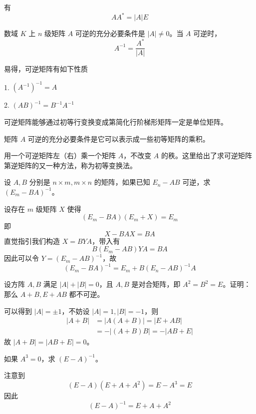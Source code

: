 有
\[AA^* = |A|E\]

\begin{theorem}
	数域 $K$ 上 $n$ 级矩阵 $A$ 可逆的充分必要条件是 $|A| \ne 0$。当 $A$ 可逆时，
	\[A^{-1} = \frac{A^*}{|A|}\]
\end{theorem}

易得，可逆矩阵有如下性质

1. $(A^{-1})^{-1} = A$

2. $(AB)^{-1} = B^{-1}A^{-1}$

可逆矩阵能够通过初等行变换变成第简化行阶梯形矩阵一定是单位矩阵。

\begin{theorem}
	矩阵 $A$ 可逆的充分必要条件是它可以表示成一些初等矩阵的乘积。
\end{theorem}

用一个可逆矩阵左（右）乘一个矩阵 $A$，不改变 $A$ 的秩。这里给出了求可逆矩阵第逆矩阵的又一种方法，称为初等变换法。

\begin{example}
	设 $A, B$ 分别是 $n \times m, m \times n$ 的矩阵，如果已知 $E_n - AB$ 可逆，求 $(E_m - BA)^{-1}$。
\end{example}

\begin{solution}
	设存在 $m$ 级矩阵 $X$ 使得
	\[ (E_m - BA)(E_m + X) = E_m \]
	即
	\[ X - BAX = BA \]
	直觉指引我们构造 $X = BYA$，带入有
	\[ B(E_m - AB)YA = BA \]
	因此可以令 $Y = (E_m - AB)^{-1}$，故
	\[ (E_m - BA)^{-1} = E_m + B(E_n - AB)^{-1}A \]
\end{solution}

\begin{example}
	设方阵 $A, B$ 满足 $|A| + |B| = 0$，且 $A, B$ 是对合矩阵，即 $A^2 = B^2 = E$。证明：那么 $A+B, E + AB$ 都不可逆。
\end{example}

\begin{solution}
	可以得到 $|A| = \pm 1$，不妨设 $|A| = 1, |B| = -1$，则
	\[ \begin{aligned}
			|A + B| & = |A(A+B)| = |E+AB|    \\
			        & = -|(A+B)B| = -|AB+E|
		\end{aligned} \]
	故 $|A+B| = |AB+E| = 0$。
\end{solution}

\begin{example}
	如果 $A^3 = 0$，求 $(E - A)^{-1}$。
\end{example}

\begin{solution}
	注意到
	\[ (E - A)(E + A + A^2) = E - A^3 = E \]
	因此
	\[ (E - A)^{-1} = E + A + A^2 \]
\end{solution}

